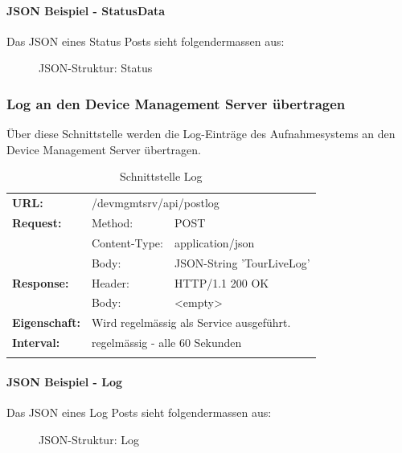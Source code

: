 \paragraph{JSON Beispiel - StatusData}

Das JSON eines Status Posts sieht folgendermassen aus:

\begin{figure}[H]
	\centering
	
	\caption{JSON-Struktur: Status}
\end{figure}


\subsubsection{Log an den Device Management Server übertragen}

Über diese Schnittstelle werden die Log-Einträge des Aufnahmesystems an den Device Management Server übertragen.

{\renewcommand{\arraystretch}{1}
    \begin{longtable}{ p{2.5cm} p{3.5cm} p{6cm}}
	\textbf{URL:} & \multicolumn{2}{p{10cm}}{/devmgmtsrv/api/postlog} \\
	\textbf{Request:} & Method: & POST \\
		& Content-Type: & application/json \\
		& Body: & JSON-String 'TourLiveLog' \\
	\textbf{Response:} &  Header: & HTTP/1.1 200 OK \\
		& Body: & <empty>	\\
	\textbf{Eigenschaft:} &  \multicolumn{2}{p{10cm}}{Wird regelmässig als Service ausgeführt.}\\ 
	\textbf{Interval:} &  \multicolumn{2}{p{10cm}}{regelmässig - alle 60 Sekunden}\\
	
\caption{Schnittstelle Log}
\end{longtable}}

\paragraph{JSON Beispiel - Log}

Das JSON eines Log Posts sieht folgendermassen aus:

\begin{figure}[H]
	\centering
	
	\caption{JSON-Struktur: Log}
\end{figure}

